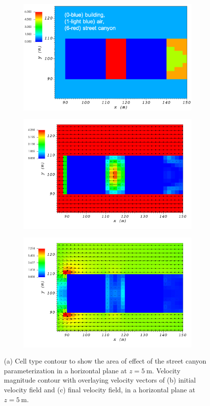 \begin{figure}[H]
    \centering
    \begin{subfigure}{\textwidth}
    \centering
    \includegraphics[width=10.3cm,keepaspectratio]{Images/street_z_5_1_init_icell.png}
    \caption{}
    \end{subfigure}
    \begin{subfigure}{\textwidth}
    \centering
    \includegraphics[width=11.0cm,keepaspectratio]{Images/street_z_5_1_init_vel.png}
    \caption{}
    \end{subfigure}
    \begin{subfigure}{\textwidth}
    \centering
    \includegraphics[width=11.0cm,keepaspectratio]{Images/street_z_5_1_final.png}
    \caption{}
    \end{subfigure}
    \caption{(a) Cell type contour to show the area of effect of the street canyon parameterization in a horizontal plane at $z=5\ \si{\meter}$. Velocity magnitude contour with overlaying velocity vectors of (b) initial velocity field and (c) final velocity field, in a horizontal plane at $z=5\ \si{\meter}$.}
\end{figure}

